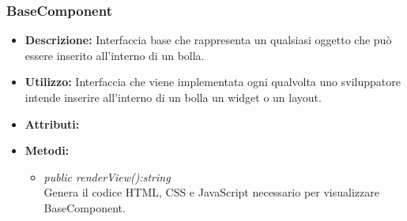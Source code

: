 \subsubsection{BaseComponent}
\begin{itemize}
\item \textbf{Descrizione:} Interfaccia base che rappresenta un qualsiasi oggetto che può essere inserito all'interno di un bolla.
\item \textbf{Utilizzo:} Interfaccia che viene implementata ogni qualvolta uno sviluppatore intende inserire all'interno di un bolla un widget o un layout.
\item \textbf{Attributi:}
\item \textbf{Metodi:}
\begin{itemize}
\item \textit{public renderView():string}\\
Genera il codice HTML, CSS e JavaScript necessario per visualizzare BaseComponent.
\end{itemize}
\end{itemize}